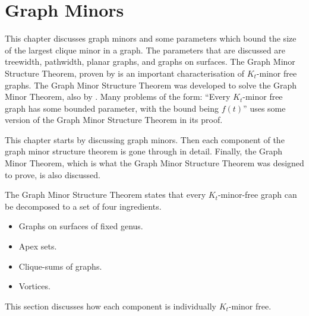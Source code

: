 \chapter{Graph Minors}\label{chap:gmst}
This chapter discusses graph minors and some parameters which bound the size of the largest clique minor in a graph. The parameters that are discussed are treewidth, pathwidth, planar graphs, and graphs on surfaces. 
The Graph Minor Structure Theorem, proven by \textcite{robertsonGraphMinorsXVI2003} is an important characterisation of $K_t$-minor free graphs. The Graph Minor Structure Theorem was developed to solve the Graph Minor Theorem, also by \textcite{robertsonGraphMinorsXX2004}. Many problems of the form: ``Every $K_t$-minor free graph has some bounded parameter, with the bound being $f(t)$'' uses some version of the Graph Minor Structure Theorem in its proof. 


This chapter starts by discussing graph minors. Then each component of the graph minor structure theorem is gone through in detail. Finally, the Graph Minor Theorem, which is what the Graph Minor Structure Theorem was designed to prove, is also discussed.

The Graph Minor Structure Theorem states that every $K_t$-minor-free graph can be decomposed to a set of four ingredients.
\begin{itemize}
	\item Graphs on surfaces of fixed genus.
	\item Apex sets.
	\item Clique-sums of graphs.
	\item Vortices.
\end{itemize}
This section discusses how each component is individually $K_t$-minor free. 













